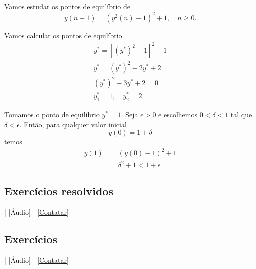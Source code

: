 \begin{ex}
  Vamos estudar os pontos de equilíbrio de
  \begin{equation}
    y(n+1) = \left(y^2(n)-1\right)^2 + 1,\quad n\geq 0.
  \end{equation}

  Vamos calcular os pontos de equilíbrio.
  \begin{gather}
    y^* = \left[\left(y^*\right)^2-1\right]^2 + 1 \\
    y^* = \left(y^*\right)^2 - 2y^* + 2 \\
    \left(y^*\right)^2 - 3y^* + 2 = 0 \\
    y_1^* = 1,\quad y_2^* = 2
  \end{gather}

  Tomamos o ponto de equilíbrio $y^*=1$. Seja $\epsilon > 0$ e escolhemos $0<\delta<1$ tal que $\delta<\epsilon$. Então, para qualquer valor inicial
  \begin{equation}
    y(0) = 1 \pm \delta
  \end{equation}
  temos
  \begin{align}
    y(1) &= \left(y(0)-1\right)^2+1\\
    &= \delta^2 + 1 < 1 + \epsilon
  \end{align}
\end{ex}

\subsection*{Exercícios resolvidos}

\begin{flushright}
  [Vídeo] | [Áudio] | \href{https://phkonzen.github.io/notas/contato.html}{[Contatar]}
\end{flushright}

\emconstrucao

\subsection*{Exercícios}

\begin{flushright}
  [Vídeo] | [Áudio] | \href{https://phkonzen.github.io/notas/contato.html}{[Contatar]}
\end{flushright}

\emconstrucao
